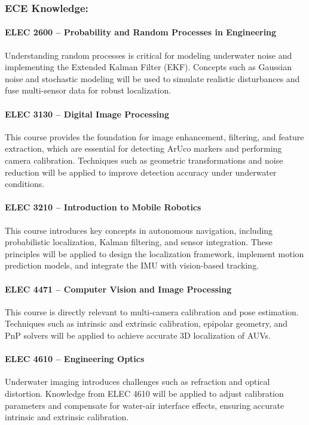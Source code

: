 \documentclass[11pt]{article}
\begin{document}
        \subsubsection{ECE Knowledge:}
            \paragraph{ELEC 2600 – Probability and Random Processes in Engineering}
            Understanding random processes is critical for modeling underwater noise and implementing the Extended Kalman Filter (EKF). Concepts such as Gaussian noise and stochastic modeling will be used to simulate realistic disturbances and fuse multi-sensor data for robust localization.
            \paragraph{ELEC 3130 – Digital Image Processing}
            This course provides the foundation for image enhancement, filtering, and feature extraction, which are essential for detecting ArUco markers and performing camera calibration. Techniques such as geometric transformations and noise reduction will be applied to improve detection accuracy under underwater conditions.
            \paragraph{ELEC 3210 – Introduction to Mobile Robotics}
            This course introduces key concepts in autonomous navigation, including probabilistic localization, Kalman filtering, and sensor integration. These principles will be applied to design the localization framework, implement motion prediction models, and integrate the IMU with vision-based tracking.
            \paragraph{ELEC 4471 – Computer Vision and Image Processing}
            This course is directly relevant to multi-camera calibration and pose estimation. Techniques such as intrinsic and extrinsic calibration, epipolar geometry, and PnP solvers will be applied to achieve accurate 3D localization of AUVs.
            \paragraph{ELEC 4610 – Engineering Optics}
            Underwater imaging introduces challenges such as refraction and optical distortion. Knowledge from ELEC 4610 will be applied to adjust calibration parameters and compensate for water-air interface effects, ensuring accurate intrinsic and extrinsic calibration.
\end{document}
